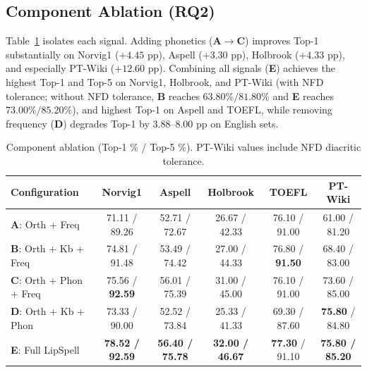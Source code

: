 \documentclass[preprint,12pt,authoryear]{elsarticle}
\begin{document}
\subsection{Component Ablation (RQ2)}
Table~\ref{tab:comp_ablation} isolates each signal. Adding phonetics (\textbf{A}$\rightarrow$\textbf{C}) improves Top-1 substantially on Norvig1 ($+4.45$ pp), Aspell ($+3.30$ pp), Holbrook ($+4.33$ pp), and especially PT-Wiki ($+12.60$ pp). Combining all signals (\textbf{E}) achieves the highest Top-1 and Top-5 on Norvig1, Holbrook, and PT-Wiki (with NFD tolerance; without NFD tolerance, \textbf{B} reaches $63.80\% / 81.80\%$ and \textbf{E} reaches $73.00\% / 85.20\%$), and highest Top-1 on Aspell and TOEFL, while removing frequency (\textbf{D}) degrades Top-1 by $3.88$--$8.00$ pp on English sets.

\begin{table}[ht]
\centering
\scriptsize
\setlength{\tabcolsep}{3.5pt}
\caption{Component ablation (Top-1 \% / Top-5 \%). PT-Wiki values include NFD diacritic tolerance.}
\label{tab:comp_ablation}
\begin{tabular}{lccccc}
\toprule
Configuration & Norvig1 & Aspell & Holbrook & TOEFL & PT-Wiki \\
\midrule
\textbf{A}: Orth + Freq              & 71.11 / 89.26 & 52.71 / 72.67 & 26.67 / 42.33 & 76.10 / 91.00 & 61.00 / 81.20 \\
\textbf{B}: Orth + Kb + Freq         & 74.81 / 91.48 & 53.49 / 74.42 & 27.00 / 44.33 & 76.80 / \textbf{91.50} & 68.40 / 83.00 \\
\textbf{C}: Orth + Phon + Freq       & 75.56 / \textbf{92.59} & 56.01 / 75.39 & 31.00 / 45.00 & 76.10 / 91.00 & 73.60 / 85.00 \\
\textbf{D}: Orth + Kb + Phon         & 73.33 / 90.00 & 52.52 / 73.84 & 25.33 / 41.33 & 69.30 / 87.60 & \textbf{75.80} / 84.80 \\
\textbf{E}: Full LipSpell            & \textbf{78.52 / 92.59} & \textbf{56.40 / 75.78} & \textbf{32.00 / 46.67} & \textbf{77.30} / 91.10 & \textbf{75.80 / 85.20} \\
\bottomrule
\end{tabular}
\end{table}
\end{document}
